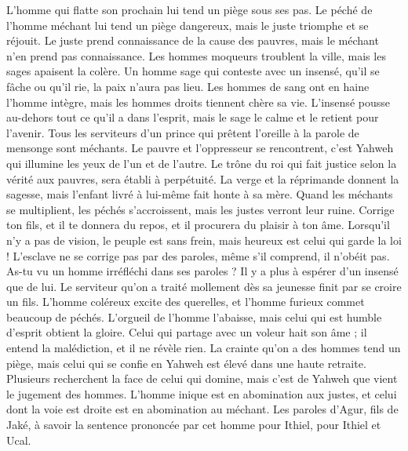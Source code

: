 \begin{multicols}{2}
L'homme qui flatte son prochain lui tend un piège sous ses pas.
Le péché de l'homme méchant lui tend un piège dangereux, mais le juste triomphe et se réjouit.
Le juste prend connaissance de la cause des pauvres, mais le méchant n'en prend pas connaissance.
Les hommes moqueurs troublent la ville, mais les sages apaisent la colère.
Un homme sage qui conteste avec un insensé, qu'il se fâche ou qu'il rie, la paix n'aura pas lieu.
Les hommes de sang ont en haine l'homme intègre, mais les hommes droits tiennent chère sa vie.
L’insensé pousse au-dehors tout ce qu’il a dans l’esprit, mais le sage le calme et le retient pour l’avenir.
Tous les serviteurs d'un prince qui prêtent l'oreille à la parole de mensonge sont méchants.
Le pauvre et l'oppresseur se rencontrent, c’est Yahweh qui illumine les yeux de l’un et de l’autre.
Le trône du roi qui fait justice selon la vérité aux pauvres, sera établi à perpétuité.
La verge et la réprimande donnent la sagesse, mais l'enfant livré à lui-même fait honte à sa mère.
Quand les méchants se multiplient, les péchés s’accroissent, mais les justes verront leur ruine.
Corrige ton fils, et il te donnera du repos, et il procurera du plaisir à ton âme.
Lorsqu'il n'y a pas de vision, le peuple est sans frein, mais heureux est celui qui garde la loi !
L’esclave ne se corrige pas par des paroles, même s’il comprend, il n’obéit pas.
As-tu vu un homme irréfléchi dans ses paroles ? Il y a plus à espérer d’un insensé que de lui.
Le serviteur qu’on a traité mollement dès sa jeunesse finit par se croire un fils.
L'homme coléreux excite des querelles, et l'homme furieux commet beaucoup de péchés.
L'orgueil de l'homme l'abaisse, mais celui qui est humble d'esprit obtient la gloire.
Celui qui partage avec un voleur hait son âme ; il entend la malédiction, et il ne révèle rien.
La crainte qu’on a des hommes tend un piège, mais celui qui se confie en Yahweh est élevé dans une haute retraite.
Plusieurs recherchent la face de celui qui domine, mais c'est de Yahweh que vient le jugement des hommes.
L'homme inique est en abomination aux justes, et celui dont la voie est droite est en abomination au méchant.
\VerseOne{}Les paroles d'Agur, fils de Jaké, à savoir la sentence prononcée par cet homme pour Ithiel, pour Ithiel et Ucal.

\end{multicols}
